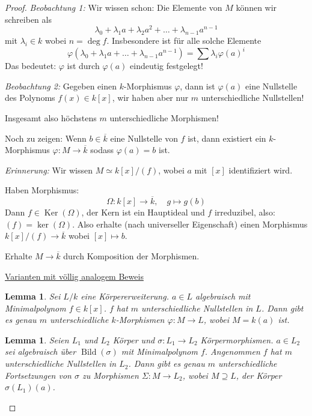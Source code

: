 \documentclass[a4paper,12pt,numbers=noenddot,parskip=full]{scrartcl}
\newcommand{\heading}{\underline}
\theoremstyle{dotless}
\newtheorem{lemma}[theorem]{Lemma}
\theoremstyle{remark}
\begin{document}
	\begin{proof}
		\textit{Beobachtung 1:} Wir wissen schon: Die Elemente von $M$ können wir schreiben als
		\begin{equation*}
			\lambda_0 + \lambda_1 a + \lambda_2 a^2 + \dots + \lambda_{n-1} a^{n-1}
		\end{equation*}
		mit $\lambda_i \in k$ wobei $n = \deg f$. Insbesondere ist für alle solche Elemente
		\begin{equation*}
			\varphi(\lambda_0 + \lambda_1 a + \dots + \lambda_{n-1} a^{n-1}) = \sum \lambda_i \varphi(a)^i
		\end{equation*}
		Das bedeutet: $\varphi$ ist durch $\varphi(a)$ eindeutig festgelegt!
		
		\textit{Beobachtung 2:} Gegeben einen $k$-Morphismus $\varphi$, dann ist $\varphi(a)$ eine Nullstelle des Polynoms $f(x) \in k[x]$, wir haben aber nur $m$ unterschiedliche Nullstellen!
		
		Insgesamt also höchstens $m$ unterschiedliche Morphismen!
		
		Noch zu zeigen: Wenn $b \in \overline{k}$ eine Nullstelle von $f$ ist, dann existiert ein $k$-Morphismus $\varphi: M \to \overline{k}$ sodass $\varphi(a) = b$ ist.
		
		\textit{Erinnerung:} Wir wissen $M \simeq k[x]/(f)$, wobei $a$ mit $[x]$ identifiziert wird.
		
		Haben Morphismus:
		\begin{equation*}
			\Omega: k[x] \to \overline{k}, \quad g \mapsto g(b)
		\end{equation*}
		Dann $f \in \operatorname{Ker}(\Omega)$, der Kern ist ein Hauptideal und $f$ irreduzibel, also: $(f) = \operatorname{ker}(\Omega)$. Also erhalte (nach universeller Eigenschaft) einen Morphismus $k[x]/(f) \to \overline{k}$ wobei $[x] \mapsto b$.
		
		Erhalte $M \to \overline{k}$ durch Komposition der Morphismen.
		
		\heading{Varianten mit völlig analogem Beweis}
		
		\begin{lemma}
			Sei $L/k$ eine Körpererweiterung. $a \in L$ algebraisch mit Minimalpolynom $f \in k[x]$. $f$ hat $m$ unterschiedliche Nullstellen in $L$. Dann gibt es genau $m$ unterschiedliche $k$-Morphismen $\varphi: M \to L$, wobei $M = k(a)$ ist.
		\end{lemma}
	
		\begin{lemma}
			Seien $L_1$ und $L_2$ Körper und $\sigma: L_1 \to L_2$ Körpermorphismen. $a \in L_2$ sei algebraisch über $\operatorname{Bild}(\sigma)$ mit Minimalpolynom $f$. Angenommen $f$ hat $m$ unterschiedliche Nullstellen in $L_2$. Dann gibt es genau $m$ unterschiedliche Fortsetzungen von $\sigma$ zu Morphismen $\Sigma: M \to L_2$, wobei $M \supseteq L$, der Körper $\sigma(L_1)(a)$.
		\end{lemma}
	\end{proof}
\end{document}
